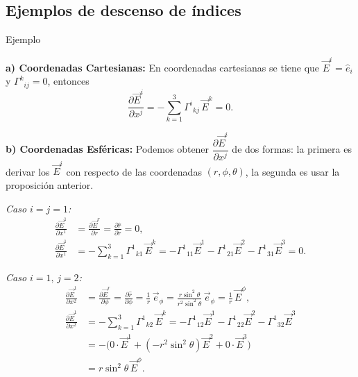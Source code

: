 \documentclass[../apunte_mecanica_clasica.tex]{subfiles}%
\begin{document}
\newpage

\subsection{Ejemplos de descenso de índices}

\begin{apuntebloque}{Ejemplo}

\textbf{a) Coordenadas Cartesianas:}  
En coordenadas cartesianas se tiene que $\vec{E}^i = \hat{e}_i$ y $\Gamma^k{}_{ij} = 0$, entonces
\begin{equation*}
    \frac{\partial \vec{E}^i}{\partial x^j}
    = - \sum_{k=1}^3 \Gamma^i{}_{kj} \, \vec{E}^k
    = 0.
\end{equation*}

\textbf{b) Coordenadas Esféricas:}  
Podemos obtener $\dfrac{\partial \vec{E}^i}{\partial x^j}$ de dos formas:  
la primera es derivar los $\vec{E}^i$ con respecto de las coordenadas $(r,\phi,\theta)$, la segunda es usar la proposición anterior.

\medskip
\textit{Caso $i=j=1$:}
\begin{align*}
    \frac{\partial \vec{E}^1}{\partial x^1} 
        &= \frac{\partial \vec{E}^r}{\partial r}
        = \frac{\partial \hat{r}}{\partial r} = 0, \\[6pt]
    \frac{\partial \vec{E}^1}{\partial x^1} 
        &= -\sum_{k=1}^3 \Gamma^1{}_{k1}\,\vec{E}^k
        = -\Gamma^1{}_{11}\vec{E}^1 - \Gamma^1{}_{21}\vec{E}^2 - \Gamma^1{}_{31}\vec{E}^3 = 0.
\end{align*}

\textit{Caso $i=1,\,j=2$:}
\begin{align*}
    \frac{\partial \vec{E}^1}{\partial x^2}
        &= \frac{\partial \vec{E}^r}{\partial \phi}
        = \frac{\partial \hat{r}}{\partial \phi}
        = \frac{1}{r}\,\vec{e}_\phi
        = \frac{r \sin^2 \theta}{r^2 \sin^2 \theta}\,\vec{e}_\phi
        = \frac{1}{r}\,\vec{E}^\phi, \\[6pt]
    \frac{\partial \vec{E}^1}{\partial x^2}
        &= -\sum_{k=1}^3 \Gamma^1{}_{k2}\,\vec{E}^k
        = -\Gamma^1{}_{12}\vec{E}^1 - \Gamma^1{}_{22}\vec{E}^2 - \Gamma^1{}_{32}\vec{E}^3 \\[6pt]
        &= -\big(0\cdot\vec{E}^1 + (-r^2\sin^2\theta)\vec{E}^2 + 0\cdot\vec{E}^3\big) \\[6pt]
        &= r\sin^2\theta\,\vec{E}^\phi.
\end{align*}


\end{apuntebloque}
\end{document}
